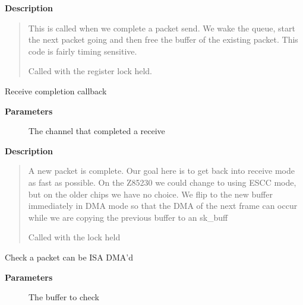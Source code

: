 \documentclass[a4paper,8pt,english]{sphinxmanual}
\begin{document}
\textbf{Description}
\begin{quote}

This is called when we complete a packet send. We wake the queue,
start the next packet going and then free the buffer of the existing
packet. This code is fairly timing sensitive.

Called with the register lock held.
\end{quote}

\begin{fulllineitems}
\label{networking/z8530book:c.z8530_rx_done}
Receive completion callback

\end{fulllineitems}


\textbf{Parameters}
\begin{description}
\item[{}] \leavevmode
The channel that completed a receive

\end{description}

\textbf{Description}
\begin{quote}

A new packet is complete. Our goal here is to get back into receive
mode as fast as possible. On the Z85230 we could change to using
ESCC mode, but on the older chips we have no choice. We flip to the
new buffer immediately in DMA mode so that the DMA of the next
frame can occur while we are copying the previous buffer to an sk\_buff

Called with the lock held
\end{quote}

\begin{fulllineitems}
\label{networking/z8530book:c.spans_boundary}
Check a packet can be ISA DMA'd

\end{fulllineitems}


\textbf{Parameters}
\begin{description}
\item[{}] \leavevmode
The buffer to check

\end{description}
\end{document}
